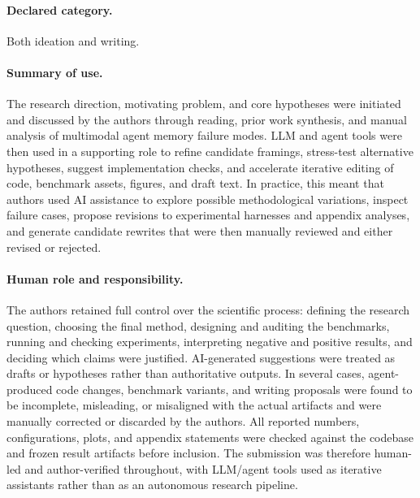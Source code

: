 \documentclass{article}
\begin{document}
\paragraph{Declared category.}
Both ideation and writing.

\paragraph{Summary of use.}
The research direction, motivating problem, and core hypotheses were initiated and discussed by the authors through reading, prior work synthesis, and manual analysis of multimodal agent memory failure modes. LLM and agent tools were then used in a supporting role to refine candidate framings, stress-test alternative hypotheses, suggest implementation checks, and accelerate iterative editing of code, benchmark assets, figures, and draft text. In practice, this meant that authors used AI assistance to explore possible methodological variations, inspect failure cases, propose revisions to experimental harnesses and appendix analyses, and generate candidate rewrites that were then manually reviewed and either revised or rejected.

\paragraph{Human role and responsibility.}
The authors retained full control over the scientific process: defining the research question, choosing the final method, designing and auditing the benchmarks, running and checking experiments, interpreting negative and positive results, and deciding which claims were justified. AI-generated suggestions were treated as drafts or hypotheses rather than authoritative outputs. In several cases, agent-produced code changes, benchmark variants, and writing proposals were found to be incomplete, misleading, or misaligned with the actual artifacts and were manually corrected or discarded by the authors. All reported numbers, configurations, plots, and appendix statements were checked against the codebase and frozen result artifacts before inclusion. The submission was therefore human-led and author-verified throughout, with LLM/agent tools used as iterative assistants rather than as an autonomous research pipeline.
\end{document}
